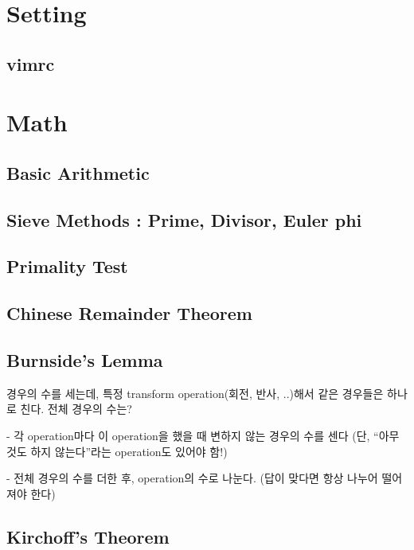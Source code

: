 \documentclass[10pt,landscape,a4paper,twocolumn]{article}
\begin{document}
\tableofcontents


\section{Setting}
\subsection{vimrc}



\section{Math}

\subsection{Basic Arithmetic}


\subsection{Sieve Methods : Prime, Divisor, Euler phi}


\subsection{Primality Test}


\subsection{Chinese Remainder Theorem}


\subsection{Burnside's Lemma}

경우의 수를 세는데, 특정 transform operation(회전, 반사, ..)해서 같은 경우들은 하나로 친다.
전체 경우의 수는?

- 각 operation마다 이 operation을 했을 때 변하지 않는 경우의 수를 센다
(단, ``아무것도 하지 않는다''라는 operation도 있어야 함!)

- 전체 경우의 수를 더한 후, operation의 수로 나눈다. (답이 맞다면 항상 나누어 떨어져야 한다)

\subsection{Kirchoff's Theorem}
\end{document}
